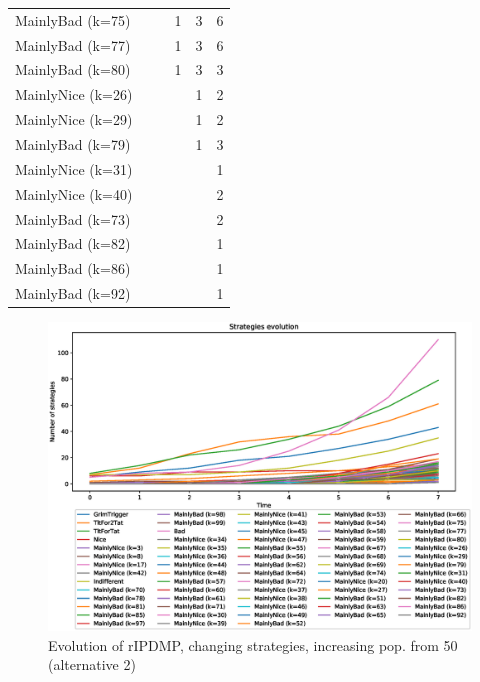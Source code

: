 \documentclass[journal,10pt,twoside]{IEEEtran}
\begin{document}
\begin{table}[ht]
\begin{minipage}{.35\textwidth}
\begin{tabular}{l|ccccc}
        MainlyBad (k=75)    &      &      &    1 &    3 &    6 \\
        MainlyBad (k=77)    &      &      &    1 &    3 &    6 \\
        MainlyBad (k=80)    &      &      &    1 &    3 &    3 \\
        MainlyNice (k=26)   &      &      &      &    1 &    2 \\
        MainlyNice (k=29)   &      &      &      &    1 &    2 \\
        MainlyBad (k=79)    &      &      &      &    1 &    3 \\
        MainlyNice (k=31)   &      &      &      &      &    1 \\
        MainlyNice (k=40)   &      &      &      &      &    2 \\
        MainlyBad (k=73)    &      &      &      &      &    2 \\
        MainlyBad (k=82)    &      &      &      &      &    1 \\
        MainlyBad (k=86)    &      &      &      &      &    1 \\
        MainlyBad (k=92)    &      &      &      &      &    1 \\ \bottomrule
    \end{tabular}
    \end{minipage}
\end{table}

\begin{figure}[!ht]
    \centering
    \includegraphics[width=.7\columnwidth]{../img/cipdmp-incr/alt2/cipdmp-evolution-increasing-pop-50}
    \caption{Evolution of rIPDMP, changing strategies, increasing pop. from 50 (alternative 2)}
    \label{fig:incrC2}
\end{figure}

\end{document}
